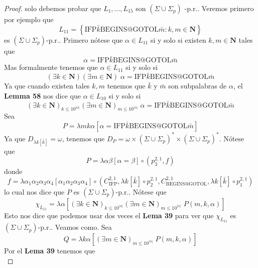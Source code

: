 \begin{lemma}
\begin{proof}
    solo debemos probar que $L_{1},...,L_{15}$ son $(\Sigma \cup \Sigma _{p})$ -p.r.. Veremos primero por ejemplo que
    \[
      \displaystyle L_{11}=\left\{ \mathrm{IFP}\bar{k}\mathrm{BEGINS}@\mathrm{GOTOL}\bar{m} :k,m\in \mathbf{N}\right\}
    \]
    es $(\Sigma \cup \Sigma _{p})$-p.r.. Primero nótese que $\alpha \in L_{11}$ si y solo si existen
    $k,m\in \mathbf{N}$ tales que
    \[
      \displaystyle \alpha =\mathrm{IFP}\bar{k}\mathrm{BEGINS}@\mathrm{GOTOL}\bar{m}
    \]
    Mas formalmente tenemos que $\alpha \in L_{11}$ si y solo si
    \[
      \displaystyle (\exists k\in \mathbf{N})(\exists m\in \mathbf{N})\;\alpha =\mathrm{IFP}\bar{ k}\mathrm{BEGINS}@
      \mathrm{GOTOL}\bar{m}
    \]
    Ya que cuando existen tales $k,m$ tenemos que $\bar{k}$ y $\bar{m}$ son subpalabras de $\alpha $, el
    \textbf{Lemma 58} nos dice que $\alpha \in L_{10}$ si y solo si
    \[
      \displaystyle (\exists k\in \mathbf{N})_{k\leq 10^{\left\vert \alpha \right\vert }}(\exists m\in \mathbf{N})_{m
      \leq 10^{\left\vert \alpha \right\vert }}\;\alpha =\mathrm{IFP}\bar{k}\mathrm{BEGINS}@\mathrm{GOTOL}\bar{m}
    \]
    Sea
    \[
      \displaystyle P=\lambda mk\alpha \left[ \alpha =\mathrm{IFP}\bar{k}\mathrm{BEGINS}@\mathrm{ GOTOL}\bar{m}\right]
    \]
    Ya que $D_{\lambda k\left[ \bar{k}\right] }=\omega $, tenemos que $ D_{P}=\omega \times (\Sigma \cup \Sigma _{p})
    ^{\ast }\times (\Sigma \cup \Sigma _{p})^{\ast }$. Nótese que
    \[
      \displaystyle P=\lambda \alpha \beta \left[ \alpha =\beta \right] \circ \left( p_{3}^{2,1},f\right)
    \]
    donde
    \[
      \displaystyle f=\lambda \alpha _{1}\alpha _{2}\alpha _{3}\alpha _{4}\left[ \alpha _{1}\alpha _{2}\alpha _{3}\alpha
      _{4}\right] \circ \left( C_{\mathrm{IFP} }^{2,1},\lambda k\left[ \bar{k}\right] \circ p_{2}^{2,1},C_{
      \mathrm{BEGINS}@ \mathrm{GOTOL}}^{2,1},\lambda k\left[ \bar{k}\right] \circ p_{1}^{2,1}\right)
    \]
    lo cual nos dice que $P$ es $(\Sigma \cup \Sigma _{p})$-p.r..
    Nótese que
    \[
      \displaystyle \chi _{L_{11}}=\lambda \alpha \left[ (\exists k\in \mathbf{N})_{k\leq 10^{\left\vert \alpha
      \right\vert }}(\exists m\in \mathbf{N})_{m\leq 10^{\left\vert \alpha \right\vert }}\;P(m,k,\alpha )\right]
    \]
    Esto nos dice que podemos usar dos veces el \textbf{Lema 39} para ver que $\chi _{L_{11}}$ es
    $(\Sigma \cup \Sigma _{p})$-p.r.. Veamos como. Sea
    \[
      \displaystyle Q=\lambda k\alpha \left[ (\exists m\in \mathbf{N})_{m\leq 10^{\left\vert \alpha \right\vert }}\;
      P(m,k,\alpha )\right]
    \]
    Por el \textbf{Lema 39} tenemos que
    \[
\]
\end{proof}
\end{lemma}

